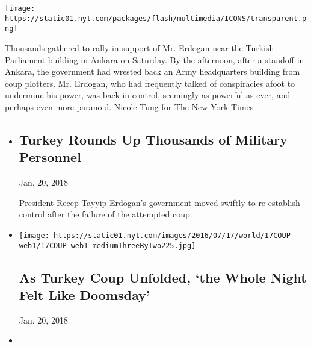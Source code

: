 \texttt{[image: https://static01.nyt.com/packages/flash/multimedia/ICONS/transparent.png]}

Thousands gathered to rally in support of Mr. Erdogan near the Turkish
Parliament building in Ankara on Saturday. By the afternoon, after a
standoff in Ankara, the government had wrested back an Army headquarters
building from coup plotters. Mr. Erdogan, who had frequently talked of
conspiracies afoot to undermine his power, was back in control,
seemingly as powerful as ever, and perhaps even more paranoid. Nicole
Tung for The New York Times

\subsection{}

\begin{itemize}
\item
  \href{https://www.nytimes.com/2016/07/17/world/europe/turkey-attempted-coup-erdogan.html}{}

  \hypertarget{turkey-rounds-up-thousands-of-military-personnel}{%
  \subsection{Turkey Rounds Up Thousands of Military
  Personnel}\label{turkey-rounds-up-thousands-of-military-personnel}}

  Jan. 20, 2018

  President Recep Tayyip Erdogan's government moved swiftly to
  re-establish control after the failure of the attempted coup.
\item
  \href{https://www.nytimes.com/2016/07/17/world/europe/as-the-coup-in-turkey-unfolded-the-whole-night-felt-like-doomsday.html}{}

  \texttt{[image: https://static01.nyt.com/images/2016/07/17/world/17COUP-web1/17COUP-web1-mediumThreeByTwo225.jpg]}

  \hypertarget{as-turkey-coup-unfolded-the-whole-night-felt-like-doomsday}{%
  \subsection{As Turkey Coup Unfolded, `the Whole Night Felt Like
  Doomsday'}\label{as-turkey-coup-unfolded-the-whole-night-felt-like-doomsday}}

  Jan. 20, 2018
\item
  \href{https://www.nytimes.com/2016/07/17/us/fethullah-gulen-turkey-coup-attempt.html}{}


\end{itemize}
